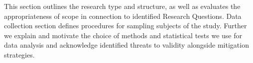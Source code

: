 \documentclass[conference]{IEEEtran}
\begin{document}


This section outlines the research type and structure, as well as evaluates the appropriateness of scope in connection to identified Research Questions. Data collection section defines procedures for sampling subjects of the study. Further we explain and motivate the choice of methods and statistical tests we use for data analysis and acknowledge identified threats to validity alongside mitigation strategies.
\end{document}
